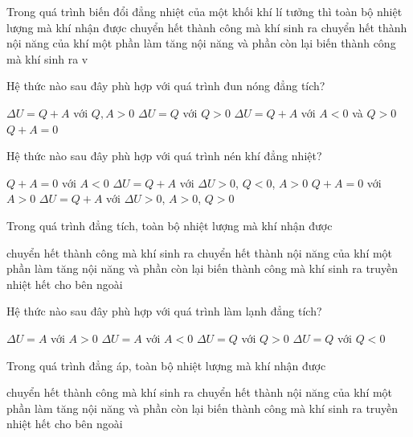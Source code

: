 \begin{ex}
	Trong quá trình biến đổi đẳng nhiệt của một khối khí lí tưởng thì toàn bộ nhiệt lượng mà khí nhận được
	\choice
	{\True chuyển hết thành công mà khí sinh ra}
	{chuyển hết thành nội năng của khí}
	{một phần làm tăng nội năng và phần còn lại biến thành công mà khí sinh ra}
	{v}
	\loigiai{}
\end{ex}
\begin{ex}
	Hệ thức nào sau đây phù hợp với quá trình đun nóng đẳng tích?
	
	\choice
	{$\Delta U=Q+A$ với $Q,A>0$}
	{\True $\Delta U=Q$ với $Q>0$}
	{$\Delta U=Q+A$ với $A<0$ và $Q>0$}
	{$Q+A=0$}
	\loigiai{}
\end{ex}
\begin{ex}
Hệ thức nào sau đây phù hợp với quá trình nén khí đẳng nhiệt?
	
	\choice
	{$Q+A=0$ với $A<0$}
	{$\Delta U=Q+A$ với $\Delta U>0$, $Q<0$, $A>0$}
	{\True $Q+A=0$ với $A>0$}
	{$\Delta U=Q+A$ với $\Delta U>0$, $A>0$, $Q>0$}
	\loigiai{}
\end{ex}
\begin{ex}
Trong quá trình đẳng tích, toàn bộ nhiệt lượng mà khí nhận được
	
	\choice
	{chuyển hết thành công mà khí sinh ra}
	{\True chuyển hết thành nội năng của khí}
	{một phần làm tăng nội năng và phần còn lại biến thành công mà khí sinh ra}
	{truyền nhiệt hết cho bên ngoài}
	\loigiai{}
\end{ex}
\begin{ex}
Hệ thức nào sau đây phù hợp với quá trình làm lạnh đẳng tích?
	
	\choice
	{$\Delta U=A$ với $A>0$}
	{$\Delta U=A$ với $A<0$}
	{$\Delta U=Q$ với $Q>0$}
	{\True $\Delta U=Q$ với $Q<0$}
	\loigiai{}
\end{ex}
\begin{ex}
	Trong quá trình đẳng áp, toàn bộ nhiệt lượng mà khí nhận được
	
	\choice
	{chuyển hết thành công mà khí sinh ra}
	{chuyển hết thành nội năng của khí}
	{\True một phần làm tăng nội năng và phần còn lại biến thành công mà khí sinh ra}
	{truyền nhiệt hết cho bên ngoài}
	\loigiai{}
\end{ex}
